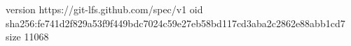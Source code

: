 version https://git-lfs.github.com/spec/v1
oid sha256:fe741d2f829a53f9f449bdc7024c59e27eb58bd117cd3aba2c2862e88abb1cd7
size 11068
